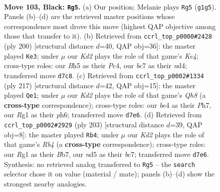 \documentclass[11pt]{article}
\begin{document}
\clearpage

\begin{figure}[p]\centering
\begin{subfigure}{0.46\textwidth}\centering
\resizebox{\linewidth}{!}{%
\newchessgame
\chessboard[
  setfen={8/2Bk4/PP6/3N3b/4B3/1K5p/5R2/6r1 b - - 6 103},
  showmover=false,
  pgfstyle=straightmove, color=movearrow, markmove={g1-g5}
]}
\caption{}
\end{subfigure}\hfill
\begin{subfigure}{0.46\textwidth}\centering
\resizebox{\linewidth}{!}{%
\newchessgame
\chessboard[
  setfen={5R2/3B4/3p4/2p1b3/2PnK3/8/6k1/8 w - - 14 101},
  showmover=false,
  pgfstyle=straightmove, color=movearrow, markmove={e4-e3}
]}
\caption{}
\end{subfigure}
\\[4pt]
\begin{subfigure}{0.46\textwidth}\centering
\resizebox{\linewidth}{!}{%
\newchessgame
\chessboard[
  setfen={8/3k3p/7P/4K3/2pN4/4BR2/8/7q b - - 66 109},
  showmover=false,
  pgfstyle=straightmove, color=movearrow, markmove={h1-e1}
]}
\caption{}
\end{subfigure}\hfill
\begin{subfigure}{0.46\textwidth}\centering
\resizebox{\linewidth}{!}{%
\newchessgame
\chessboard[
  setfen={8/1bB3kp/1P6/1r2N3/5PPK/8/8/8 b - - 0 102},
  showmover=false,
  pgfstyle=straightmove, color=movearrow, markmove={b5-b4}
]}
\caption{}
\end{subfigure}
\caption{\textbf{Move 103, Black: \texttt{Rg5}.} (a) Our position; Melanie plays \texttt{Rg5} (\texttt{g1g5}). Panels (b)--(d) are the retrieved master positions whose correspondence most drove this move (highest QAP objective among those that transfer to it). (b) Retrieved from \texttt{ccrl\_top\_p0000\#2428} (ply 200) [structural distance $d$=40, QAP obj=36]: the master played \texttt{Ke3}; under $\mu$ our \emph{Kd2} plays the role of that game's \emph{Ke4}; cross-type roles: our \emph{B}h5 as their \emph{P}c4, our \emph{b}c7 as their \emph{n}d4; transferred move \texttt{d7c8}. (c) Retrieved from \texttt{ccrl\_top\_p0002\#1334} (ply 217) [structural distance $d$=42, QAP obj=15]: the master played \texttt{Qe1}; under $\mu$ our \emph{Kd2} plays the role of that game's \emph{Qh8} (a \textbf{cross-type} correspondence); cross-type roles: our \emph{b}e4 as their \emph{P}h7, our \emph{R}g1 as their \emph{p}h6; transferred move \texttt{d7e6}. (d) Retrieved from \texttt{ccrl\_top\_p0002\#2929} (ply 203) [structural distance $d$=39, QAP obj=8]: the master played \texttt{Rb4}; under $\mu$ our \emph{Kd2} plays the role of that game's \emph{Rb4} (a \textbf{cross-type} correspondence); cross-type roles: our \emph{R}g1 as their \emph{B}b7, our \emph{n}d5 as their \emph{b}c7; transferred move \texttt{d7e6}. Synthesis: no retrieved analog transferred to \texttt{Rg5} -- the \texttt{search} selector chose it on value (material / mate); panels (b)--(d) show the strongest nearby analogies.}
\label{fig:thought-m205}
\end{figure}
\end{document}
